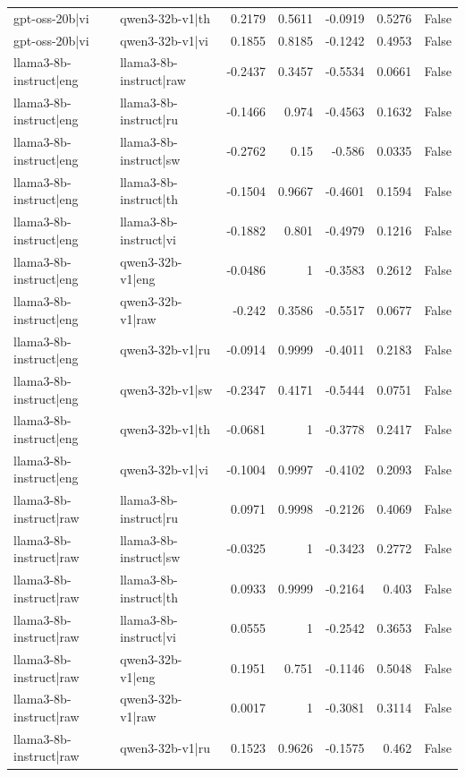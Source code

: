 \begin{table}
\begin{tabular}{l l r r r r l}
gpt-oss-20b|vi & qwen3-32b-v1|th & 0.2179 & 0.5611 & -0.0919 & 0.5276 & False \\
gpt-oss-20b|vi & qwen3-32b-v1|vi & 0.1855 & 0.8185 & -0.1242 & 0.4953 & False \\
llama3-8b-instruct|eng & llama3-8b-instruct|raw & -0.2437 & 0.3457 & -0.5534 & 0.0661 & False \\
llama3-8b-instruct|eng & llama3-8b-instruct|ru & -0.1466 & 0.974 & -0.4563 & 0.1632 & False \\
llama3-8b-instruct|eng & llama3-8b-instruct|sw & -0.2762 & 0.15 & -0.586 & 0.0335 & False \\
llama3-8b-instruct|eng & llama3-8b-instruct|th & -0.1504 & 0.9667 & -0.4601 & 0.1594 & False \\
llama3-8b-instruct|eng & llama3-8b-instruct|vi & -0.1882 & 0.801 & -0.4979 & 0.1216 & False \\
llama3-8b-instruct|eng & qwen3-32b-v1|eng & -0.0486 & 1 & -0.3583 & 0.2612 & False \\
llama3-8b-instruct|eng & qwen3-32b-v1|raw & -0.242 & 0.3586 & -0.5517 & 0.0677 & False \\
llama3-8b-instruct|eng & qwen3-32b-v1|ru & -0.0914 & 0.9999 & -0.4011 & 0.2183 & False \\
llama3-8b-instruct|eng & qwen3-32b-v1|sw & -0.2347 & 0.4171 & -0.5444 & 0.0751 & False \\
llama3-8b-instruct|eng & qwen3-32b-v1|th & -0.0681 & 1 & -0.3778 & 0.2417 & False \\
llama3-8b-instruct|eng & qwen3-32b-v1|vi & -0.1004 & 0.9997 & -0.4102 & 0.2093 & False \\
llama3-8b-instruct|raw & llama3-8b-instruct|ru & 0.0971 & 0.9998 & -0.2126 & 0.4069 & False \\
llama3-8b-instruct|raw & llama3-8b-instruct|sw & -0.0325 & 1 & -0.3423 & 0.2772 & False \\
llama3-8b-instruct|raw & llama3-8b-instruct|th & 0.0933 & 0.9999 & -0.2164 & 0.403 & False \\
llama3-8b-instruct|raw & llama3-8b-instruct|vi & 0.0555 & 1 & -0.2542 & 0.3653 & False \\
llama3-8b-instruct|raw & qwen3-32b-v1|eng & 0.1951 & 0.751 & -0.1146 & 0.5048 & False \\
llama3-8b-instruct|raw & qwen3-32b-v1|raw & 0.0017 & 1 & -0.3081 & 0.3114 & False \\
llama3-8b-instruct|raw & qwen3-32b-v1|ru & 0.1523 & 0.9626 & -0.1575 & 0.462 & False \\

\end{tabular}
\end{table}
